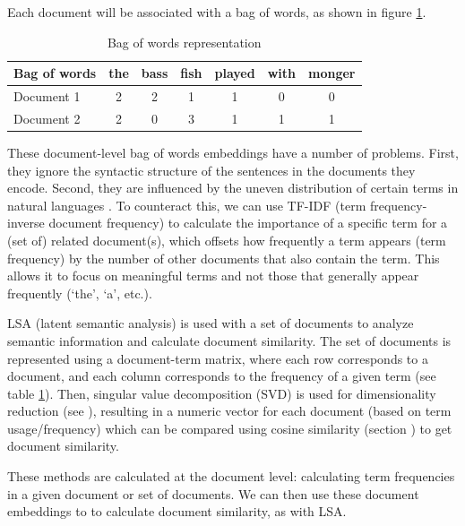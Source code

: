 Each document will be associated with a bag of words, as shown in figure \ref{exampleBags}.

\begin{table}[h]
    \centering
    \begin{tabular}{|l|c|c|c|c|c|c|}
    \hline
    Bag of words & the & bass & fish & played & with & monger \\
    \hline
    Document 1 & 2 & 2 & 1 & 1 & 0 & 0 \\
    Document 2 & 2 & 0 & 3 & 1 & 1 & 1 \\
    \hline
    \end{tabular}
    \caption{Bag of words representation}
    \label{exampleBags}
\end{table}
These document-level bag of words embeddings have a number of problems. First, they ignore the syntactic structure of the sentences in the documents they encode.  Second, they are influenced by the uneven distribution of certain terms in natural languages \cite{piantadosi2014zipf, zipf1945meaning}. To counteract this, we can use TF-IDF (term frequency-inverse document frequency) to calculate the importance of a specific term for a (set of) related document(s), which offsets how frequently a term appears (term frequency) by the number of other documents that also contain the term. This allows it to focus on meaningful terms and not those that generally appear frequently (`the', `a', etc.). 

LSA (latent semantic analysis) is used with a set of documents to analyze semantic information and calculate document similarity. The set of documents is represented using a document-term matrix, where each row corresponds to a document, and each column corresponds to the frequency of a given term (see table \ref{exampleBags}). Then, singular value decomposition (SVD) is used for dimensionality reduction (see ), resulting in a numeric vector for each document (based on term usage/frequency) which can be compared using cosine similarity (section ) to get document similarity.

These methods are calculated at the document level: calculating term frequencies in a given document or set of documents. We can then use these document embeddings to to calculate document similarity, as with LSA.

